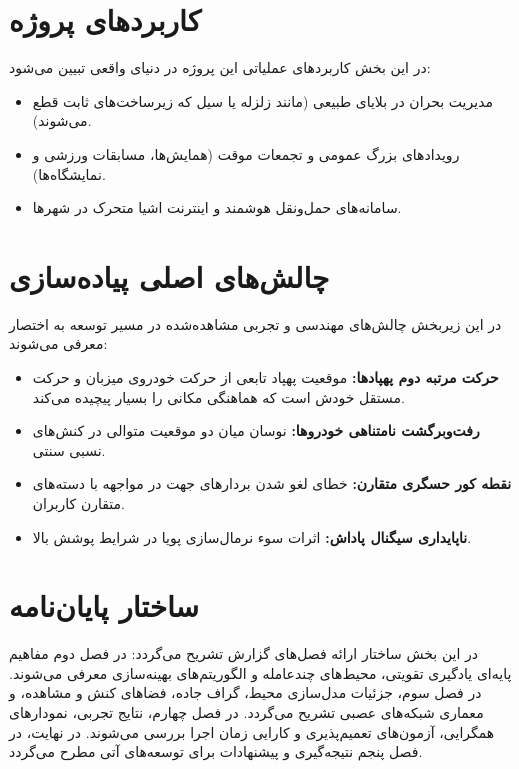 \documentclass[a4paper,12pt,oneside]{report}
\begin{document}
\section{کاربردهای پروژه}
در این بخش کاربردهای عملیاتی این پروژه در دنیای واقعی تبیین می‌شود:
\begin{itemize}
    \item مدیریت بحران در بلایای طبیعی (مانند زلزله یا سیل که زیرساخت‌های ثابت قطع می‌شوند).
    \item رویدادهای بزرگ عمومی و تجمعات موقت (همایش‌ها، مسابقات ورزشی و نمایشگاه‌ها).
    \item سامانه‌های حمل‌ونقل هوشمند و اینترنت اشیا متحرک در شهرها.
\end{itemize}

\section{چالش‌های اصلی پیاده‌سازی}
در این زیربخش چالش‌های مهندسی و تجربی مشاهده‌شده در مسیر توسعه به اختصار معرفی می‌شوند:
\begin{itemize}
    \item \textbf{حرکت مرتبه دوم پهپادها:} موقعیت پهپاد تابعی از حرکت خودروی میزبان و حرکت مستقل خودش است که هماهنگی مکانی را بسیار پیچیده می‌کند.
    \item \textbf{رفت‌وبرگشت نامتناهی خودروها:} نوسان میان دو موقعیت متوالی در کنش‌های نسبی سنتی.
    \item \textbf{نقطه کور حسگری متقارن:} خطای لغو شدن بردارهای جهت در مواجهه با دسته‌های متقارن کاربران.
    \item \textbf{ناپایداری سیگنال پاداش:} اثرات سوء نرمال‌سازی پویا در شرایط پوشش بالا.
\end{itemize}

\section{ساختار پایان‌نامه}
در این بخش ساختار ارائه فصل‌های گزارش تشریح می‌گردد: در فصل دوم مفاهیم پایه‌ای یادگیری تقویتی، محیط‌های چندعامله و الگوریتم‌های بهینه‌سازی معرفی می‌شوند. در فصل سوم، جزئیات مدل‌سازی محیط، گراف جاده، فضاهای کنش و مشاهده، و معماری شبکه‌های عصبی تشریح می‌گردد. در فصل چهارم، نتایج تجربی، نمودارهای همگرایی، آزمون‌های تعمیم‌پذیری و کارایی زمان اجرا بررسی می‌شوند. در نهایت، در فصل پنجم نتیجه‌گیری و پیشنهادات برای توسعه‌های آتی مطرح می‌گردد.

\end{document}
